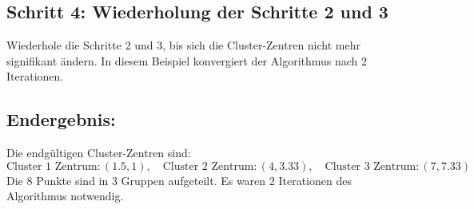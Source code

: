 \documentclass{article}
\begin{document}
\subsection*{Schritt 4: Wiederholung der Schritte 2 und 3}

Wiederhole die Schritte 2 und 3, bis sich die Cluster-Zentren nicht mehr signifikant ändern. In diesem Beispiel konvergiert der Algorithmus nach 2 Iterationen.

\subsection*{Endergebnis:}
Die endgültigen Cluster-Zentren sind:
\[
\text{Cluster 1 Zentrum}: (1.5, 1), \quad \text{Cluster 2 Zentrum}: (4, 3.33), \quad \text{Cluster 3 Zentrum}: (7, 7.33)
\]
Die 8 Punkte sind in 3 Gruppen aufgeteilt. Es waren 2 Iterationen des Algorithmus notwendig.
\end{document}
